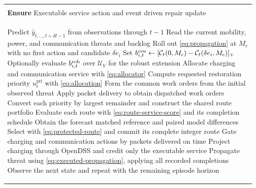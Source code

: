 \documentclass[journal]{IEEEtran}
\newcommand{\DIFnewtablecolor}{\color{blue}}
\begin{document}
\begin{algorithm}[t]\DIFnewtablecolor
\caption{Physically constrained coupled rollout}
\label{alg:pcr}
\begin{tabular}{@{}p{\linewidth}@{}}
\toprule
\begin{minipage}{0.96\linewidth}
\textbf{Require} Observed history, current backlog and threat, graph $A$, budgets
$B_{\mathrm{ch}}$, $B_{\mathrm{com}}$, $B_{\mathrm{res}}$, horizon $H$, and
trained forecaster $f_{\theta}$ \\
\textbf{Ensure} Executable service action and event driven repair update
\end{minipage}
\\
\midrule
\begin{minipage}{0.96\linewidth}
\begin{algorithmic}[1]
\State Predict $\hat y_{t,\ldots,t+H-1}$ from observations through $t-1$
\State Read the current mobility, power, and communication threats and backlog
\For{each zone $i$}
\State Roll out \eqref{eq:propagation} at $M_c$ with no first action and candidate $\delta e_i$
\State Set $b_{i,t}^{\rm cen}\gets[\mathcal{C}_t(0,M_c)-\mathcal{C}_t(\delta e_i,M_c)]_+$
\State Optionally evaluate $b_{i,t}^{\rm rob}$ over $\mathcal U_V$ for the robust extension
\EndFor
\State Allocate charging and communication service with \eqref{eq:allocator}
\State Compute requested restoration priority $u_t^{\mathrm{pri}}$ with \eqref{eq:allocation}
\If{this is the first hour of the restoration episode}
\State Form the common work orders from the initial observed threat
\State Apply packet delivery to obtain dispatched work orders
\State Convert each priority by largest remainder and construct the shared route portfolio
\State Evaluate each route with \eqref{eq:route-service-score} and its completion schedule
\State Obtain the forecast matched reference and paired model differences
\State Select with \eqref{eq:protected-route} and commit its complete integer route
\EndIf
\State Gate charging and communication actions by packets delivered on time
\State Project charging through OpenDSS and credit only the executable service
\State Propagate threat using \eqref{eq:executed-propagation}, applying all recorded completions
\State Observe the next state and repeat with the remaining episode horizon
\end{algorithmic}
\end{minipage}
\\
\bottomrule
\end{tabular}
\end{algorithm}
\end{document}
